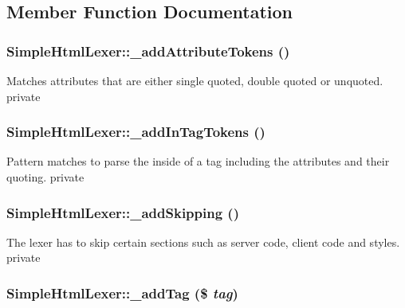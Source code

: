 \subsection{Member Function Documentation}
\hypertarget{class_simple_html_lexer_a4cd292408994d7af7c2610f3c95798ca}{
\subsubsection[{\_\-addAttributeTokens}]{\setlength{\rightskip}{0pt plus 5cm}SimpleHtmlLexer::\_\-addAttributeTokens ()}}
\label{class_simple_html_lexer_a4cd292408994d7af7c2610f3c95798ca}
Matches attributes that are either single quoted, double quoted or unquoted.  private \hypertarget{class_simple_html_lexer_a1a2cb51b90abd02362c71ce93f220e58}{
\subsubsection[{\_\-addInTagTokens}]{\setlength{\rightskip}{0pt plus 5cm}SimpleHtmlLexer::\_\-addInTagTokens ()}}
\label{class_simple_html_lexer_a1a2cb51b90abd02362c71ce93f220e58}
Pattern matches to parse the inside of a tag including the attributes and their quoting.  private \hypertarget{class_simple_html_lexer_ab79435c67c062d6ac87e977cf69f4079}{
\subsubsection[{\_\-addSkipping}]{\setlength{\rightskip}{0pt plus 5cm}SimpleHtmlLexer::\_\-addSkipping ()}}
\label{class_simple_html_lexer_ab79435c67c062d6ac87e977cf69f4079}
The lexer has to skip certain sections such as server code, client code and styles.  private \hypertarget{class_simple_html_lexer_a75ea520f6f309214e4dbd26579ef8e41}{
\subsubsection[{\_\-addTag}]{\setlength{\rightskip}{0pt plus 5cm}SimpleHtmlLexer::\_\-addTag (\$ {\em tag})}}
